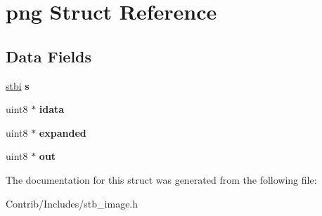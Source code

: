 \hypertarget{structpng}{}\section{png Struct Reference}
\label{structpng}
\subsection*{Data Fields}
\begin{DoxyCompactItemize}
\item 
\hyperlink{structstbi}{stbi} {\bfseries s}\hypertarget{structpng_a7dfd23d966072a9898748c419db6d288}{}\label{structpng_a7dfd23d966072a9898748c419db6d288}

\item 
uint8 $\ast$ {\bfseries idata}\hypertarget{structpng_ab8c488ce31e66fd16fe7dd317e636086}{}\label{structpng_ab8c488ce31e66fd16fe7dd317e636086}

\item 
uint8 $\ast$ {\bfseries expanded}\hypertarget{structpng_ae530a3b14ed13f9f4355c38feadd6c34}{}\label{structpng_ae530a3b14ed13f9f4355c38feadd6c34}

\item 
uint8 $\ast$ {\bfseries out}\hypertarget{structpng_ae5e61dae4b6b776fc8a34d994895faa2}{}\label{structpng_ae5e61dae4b6b776fc8a34d994895faa2}

\end{DoxyCompactItemize}


The documentation for this struct was generated from the following file\+:\begin{DoxyCompactItemize}
\item 
Contrib/\+Includes/stb\+\_\+image.\+h\end{DoxyCompactItemize}
